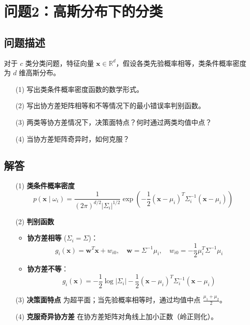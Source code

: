 \documentclass[UTF8]{report}
\theoremstyle{MyLineTheoremStyle} %
\theoremstyle{MyBlockTheoremStyle} %
\theoremstyle{MySubsubsectionStyle} %
\begin{document}
\section{问题2：高斯分布下的分类}

\subsection{问题描述}
对于 \( c \) 类分类问题，特征向量 \(\mathbf{x} \in \mathbb{R}^d \)，假设各类先验概率相等，类条件概率密度为 \( d \) 维高斯分布。  
\begin{enumerate}
    \item[(1)] 写出类条件概率密度函数的数学形式。
    \item[(2)] 写出协方差矩阵相等和不等情况下的最小错误率判别函数。
    \item[(3)] 两类等协方差情况下，决策面特点？何时通过两类均值中点？
    \item[(4)] 当协方差矩阵奇异时，如何克服？
\end{enumerate}

\subsection{解答}
\begin{itemize}
    \item[(1)] \textbf{类条件概率密度}  
    \[
    p(\mathbf{x} \mid \omega_i) = \frac{1}{(2\pi)^{d/2} |\Sigma_i|^{1/2}} \exp\left( -\frac{1}{2} (\mathbf{x} - \mu_i)^T \Sigma_i^{-1} (\mathbf{x} - \mu_i) \right)
    \]
    \item[(2)] \textbf{判别函数}  
    \begin{itemize}
        \item \textbf{协方差相等} (\(\Sigma_i = \Sigma\))：  
        \[
        g_i(\mathbf{x}) = \mathbf{w}^T \mathbf{x} + w_{i0}, \quad \mathbf{w} = \Sigma^{-1} \mu_i, \quad w_{i0} = -\frac{1}{2} \mu_i^T \Sigma^{-1} \mu_i
        \]
        \item \textbf{协方差不等}：  
        \[
        g_i(\mathbf{x}) = -\frac{1}{2} \log |\Sigma_i| - \frac{1}{2} (\mathbf{x} - \mu_i)^T \Sigma_i^{-1} (\mathbf{x} - \mu_i)
        \]
    \end{itemize}
    \item[(3)] \textbf{决策面特点}  
    为超平面；当先验概率相等时，通过均值中点 \(\frac{\mu_1 + \mu_2}{2}\)。
    \item[(4)] \textbf{克服奇异协方差}  
    在协方差矩阵对角线上加小正数（岭正则化）。
\end{itemize}
\end{document}
